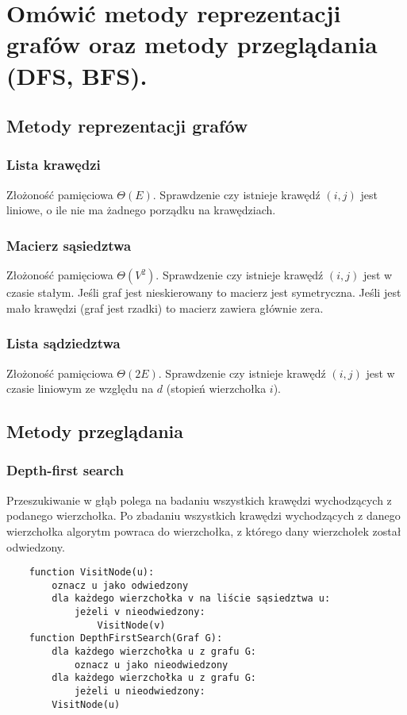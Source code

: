 \section{Omówić metody reprezentacji grafów oraz metody przeglądania (DFS, BFS).}

\subsection{Metody reprezentacji grafów}

\subsubsection{Lista krawędzi}
Złożoność pamięciowa $\Theta(E)$.
Sprawdzenie czy istnieje krawędź $(i, j)$ jest liniowe, o ile nie ma żadnego porządku na krawędziach.

\subsubsection{Macierz sąsiedztwa}
Złożoność pamięciowa $\Theta(V^2)$.
Sprawdzenie czy istnieje krawędź $(i, j)$ jest w czasie stałym.
Jeśli graf jest nieskierowany to macierz jest symetryczna.
Jeśli jest mało krawędzi (graf jest rzadki) to macierz zawiera głównie zera.

\subsubsection{Lista sądziedztwa}

Złożoność pamięciowa $\Theta(2E)$.
Sprawdzenie czy istnieje krawędź $(i, j)$ jest w czasie liniowym ze względu na $d$ (stopień wierzchołka $i$).

\subsection{Metody przeglądania}

\subsubsection{Depth-first search}

Przeszukiwanie w głąb polega na badaniu wszystkich krawędzi wychodzących z podanego wierzchołka.
Po zbadaniu wszystkich krawędzi wychodzących z danego wierzchołka algorytm powraca do wierzchołka,
z którego dany wierzchołek został odwiedzony.

\begin{samepage}
    \begin{verbatim}
    function VisitNode(u):
        oznacz u jako odwiedzony
        dla każdego wierzchołka v na liście sąsiedztwa u:
            jeżeli v nieodwiedzony:
                VisitNode(v)
    function DepthFirstSearch(Graf G):
        dla każdego wierzchołka u z grafu G:
            oznacz u jako nieodwiedzony
        dla każdego wierzchołka u z grafu G:
            jeżeli u nieodwiedzony:
        VisitNode(u)
    \end{verbatim}
\end{samepage}

